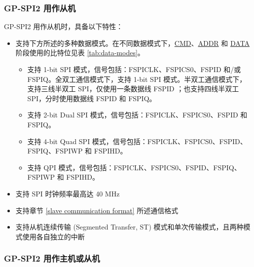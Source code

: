 \documentclass[main\_\_CN.tex]{subfiles}
\begin{document}
\subsubsection{GP-SPI2 用作从机}

GP-SPI2 用作从机时，具备以下特性：
  \begin{itemize}
      \item 支持下方所述的多种数据模式。在不同数据模式下，\hyperref[phase:cmd]{CMD}、\hyperref[phase:addr]{ADDR} 和 \hyperref[phase:data]{DATA} 阶段使用的比特位见表 \ref{tab:data-modes}。
      \begin{itemize}
            \item 支持 1-bit SPI 模式，信号包括：FSPICLK、FSPICS0、FSPID 和/或 FSPIQ。全双工通信模式下，支持 1-bit SPI 模式。半双工通信模式下，支持三线半双工 SPI，仅使用一条数据线 FSPID ；也支持四线半双工 SPI，分时使用数据线 FSPID 和 FSPIQ。

            \item 支持 2-bit Dual SPI 模式，信号包括：FSPICLK、FSPICS0、FSPID 和 FSPIQ。

            \item 支持 4-bit Quad SPI 模式，信号包括：FSPICLK、FSPICS0、FSPID、FSPIQ、FSPIWP 和 FSPIHD。

            \item 支持 QPI 模式，信号包括：FSPICLK、FSPICS0、FSPID、FSPIQ、FSPIWP 和 FSPIHD。
      \end{itemize}
      \item 支持 SPI 时钟频率最高达 40 MHz
      \item 支持章节 \ref{slave communication format} 所述通信格式
      \item 支持从机连续传输 (Segmented Transfer, ST) 模式和单次传输模式，且两种模式使用各自独立的中断
  \end{itemize}

\subsubsection{GP-SPI2 用作主机或从机}
\end{document}
